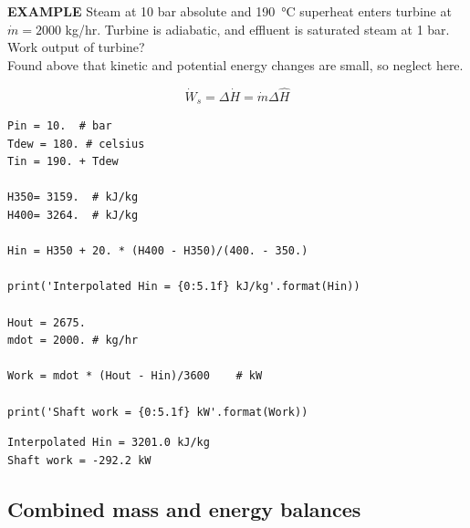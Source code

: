 \documentclass[11pt]{article}
\begin{document}
\begin{framed}
\noindent \textbf{EXAMPLE} Steam at 10 bar absolute and \SI{190}{\celsius} superheat enters turbine at \(\dot{m}= 2000\) kg/hr.  Turbine is adiabatic, and effluent is saturated steam at 1 bar.  Work output of turbine?
\\
\noindent Found above that kinetic and potential energy changes are small, so neglect here.

\[ \dot{W}_{s} = \Delta\dot{H} = \dot{m}\Delta\hat{H} \]

\end{framed}

\begin{verbatim}
Pin = 10.  # bar
Tdew = 180. # celsius
Tin = 190. + Tdew

H350= 3159.  # kJ/kg
H400= 3264.  # kJ/kg

Hin = H350 + 20. * (H400 - H350)/(400. - 350.)

print('Interpolated Hin = {0:5.1f} kJ/kg'.format(Hin))

Hout = 2675.
mdot = 2000. # kg/hr

Work = mdot * (Hout - Hin)/3600    # kW

print('Shaft work = {0:5.1f} kW'.format(Work))
\end{verbatim}

\begin{verbatim}
Interpolated Hin = 3201.0 kJ/kg
Shaft work = -292.2 kW
\end{verbatim}

\subsection{Combined mass and energy balances}
\label{sec-9-5}
\end{document}
